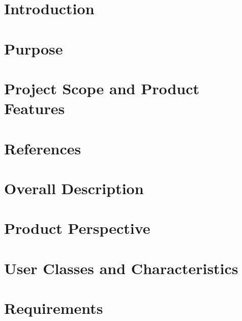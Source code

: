 \documentclass[12pt]{article}
\title{\myTitle}								%
\author{\allAuthorsShort}
\date{24 Sept 2019}											%
\begin{document}

\tableofcontents
\pagebreak
\section{Introduction}
\section{Purpose}
\section{Project Scope and Product Features}
\section{References}
\section{Overall Description}
\section{Product Perspective}
\section{User Classes and Characteristics}

\section{Requirements}


\newpage
%
%
\end{document}
